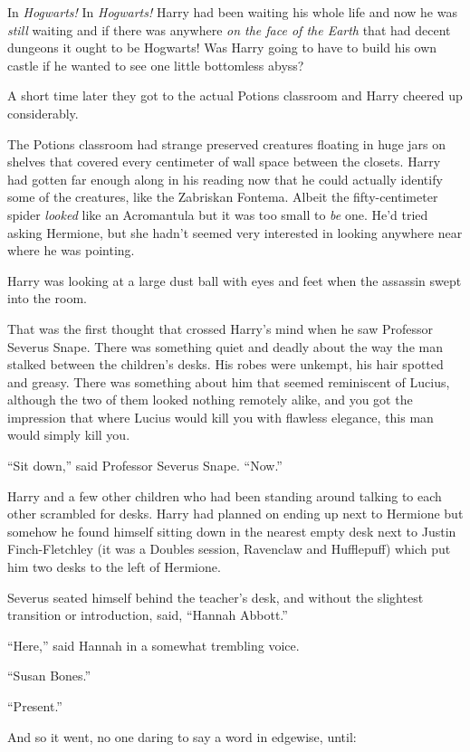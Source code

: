 In \emph{Hogwarts!} In \emph{Hogwarts!} Harry had been waiting his whole
life and now he was \emph{still} waiting and if there was anywhere
\emph{on the face of the Earth} that had decent dungeons it ought to be
Hogwarts! Was Harry going to have to build his own castle if he wanted
to see one little bottomless abyss?

A short time later they got to the actual Potions classroom and Harry
cheered up considerably.

The Potions classroom had strange preserved creatures floating in huge
jars on shelves that covered every centimeter of wall space between the
closets. Harry had gotten far enough along in his reading now that he
could actually identify some of the creatures, like the Zabriskan
Fontema. Albeit the fifty-centimeter spider \emph{looked} like an
Acromantula but it was too small to \emph{be} one. He'd tried asking
Hermione, but she hadn't seemed very interested in looking anywhere near
where he was pointing.

Harry was looking at a large dust ball with eyes and feet when the
assassin swept into the room.

That was the first thought that crossed Harry's mind when he saw
Professor Severus Snape. There was something quiet and deadly about the
way the man stalked between the children's desks. His robes were
unkempt, his hair spotted and greasy. There was something about him that
seemed reminiscent of Lucius, although the two of them looked nothing
remotely alike, and you got the impression that where Lucius would kill
you with flawless elegance, this man would simply kill you.

``Sit down,'' said Professor Severus Snape. ``Now.''

Harry and a few other children who had been standing around talking to
each other scrambled for desks. Harry had planned on ending up next to
Hermione but somehow he found himself sitting down in the nearest empty
desk next to Justin Finch-Fletchley (it was a Doubles session, Ravenclaw
and Hufflepuff) which put him two desks to the left of Hermione.

Severus seated himself behind the teacher's desk, and without the
slightest transition or introduction, said, ``Hannah Abbott.''

``Here,'' said Hannah in a somewhat trembling voice.

``Susan Bones.''

``Present.''

And so it went, no one daring to say a word in edgewise, until:

